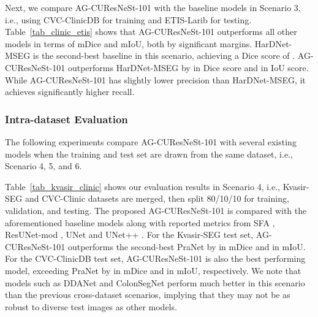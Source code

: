 \documentclass[review, sort&compress]{elsarticle}
\begin{document}
Next, we compare AG-CUResNeSt-101 with the baseline models in Scenario 3, i.e., using CVC-ClinicDB for training and ETIS-Larib for testing. Table~\ref{tab_clinic_etis} shows that AG-CUResNeSt-101 outperforms all other models in terms of mDice and mIoU, both by significant margins. HarDNet-MSEG is the second-best baseline in this scenario, achieving a Dice score of . AG-CUResNeSt-101 outperforms HarDNet-MSEG by  in Dice score and  in IoU score. While AG-CUResNeSt-101 has slightly lower precision than HarDNet-MSEG, it achieves significantly higher recall.


\subsubsection{Intra-dataset Evaluation}
The following experiments compare AG-CUResNeSt-101 with several existing models when the training and test set are drawn from the same dataset, i.e., Scenario 4, 5, and 6.

Table~\ref{tab_kvasir_clinic} shows our evaluation results in Scenario 4, i.e., Kvasir-SEG and CVC-Clinic datasets are merged, then split 80/10/10 for training, validation, and testing. The proposed AG-CUResNeSt-101 is compared with the aforementioned baseline models along with reported metrics from SFA \cite{fang2019selective}, ResUNet-mod \cite{zhang2018road}, UNet \cite{ronneberger2015u} and UNet++ \cite{zhou2019unet++}. For the Kvasir-SEG test set, AG-CUResNeSt-101 outperforms the second-best PraNet by  in mDice and  in mIoU. For the CVC-ClinicDB test set, AG-CUResNeSt-101 is also the best performing model, exceeding PraNet by  in mDice and  in mIoU, respectively. We note that models such as DDANet and ColonSegNet perform much better in this scenario than the previous cross-dataset scenarios, implying that they may not be as robust to diverse test images as other models.
\end{document}
